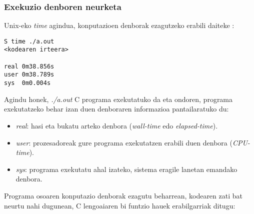 \subsubsection*{Exekuzio denboren neurketa}

Unix-eko \emph{time} agindua, konputazioen denborak ezagutzeko erabili daiteke \cite{Pacheco2011}:

\begin{lstlisting} 
S time ./a.out
<kodearen irteera>

real 0m38.856s
user 0m38.789s
sys  0m0.004s
\end{lstlisting}

Agindu honek, \emph{./a.out} C programa exekutatuko da eta ondoren, programa exekutatzeko behar izan duen denboraren informazioa pantailaratuko du:
\begin{itemize}
\item  \emph{real}: hasi eta bukatu arteko denbora (\emph{wall-time} edo \emph{elapsed-time}).
\item \emph{user}:  prozesadoreak gure programa exekutatzen erabili duen denbora (\emph{CPU-time}).
\item \emph{sys}:  programa exekutatu ahal izateko, sistema eragile lanetan emandako denbora. 
\end{itemize}

Programa osoaren konputazio denborak ezagutu beharrean, kodearen zati bat neurtu nahi dugunean, C lengoaiaren bi funtzio hauek erabilgarriak ditugu:

